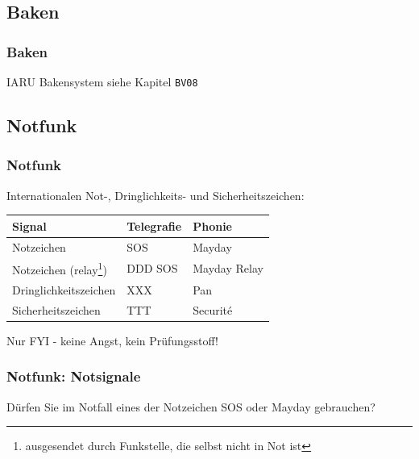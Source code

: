 \subsection{Baken}

\begin{frame}
    \frametitle{Baken}

    IARU Bakensystem siehe Kapitel \texttt{BV08}

\end{frame}

\subsection{Notfunk}


\begin{frame}
    \frametitle{Notfunk}

    Internationalen Not-, Dringlichkeits- und Sicherheitszeichen:

    \begin{center}
    \begin{tabular}{|l|l|l|}\hline
        \textbf{Signal}       & \textbf{Telegrafie} & \textbf{Phonie} \\ \hline \hline
        Notzeichen            & SOS                 & Mayday          \\ \hline
        Notzeichen (relay\footnote{ausgesendet durch Funkstelle, die selbst nicht in Not ist})
                              & DDD SOS & Mayday Relay \\ \hline
        Dringlichkeitszeichen & XXX                 & Pan              \\ \hline
        Sicherheitszeichen    & TTT                 & Securité         \\ \hline
    \end{tabular}
    \end{center}

    Nur FYI - keine Angst, kein Prüfungsstoff!

\end{frame}

\begin{frame}
    \frametitle{Notfunk: Notsignale}

    \begin{block}{Dürfen Sie im Notfall eines der Notzeichen SOS oder Mayday gebrauchen?}
    \end{block}

\end{frame}

